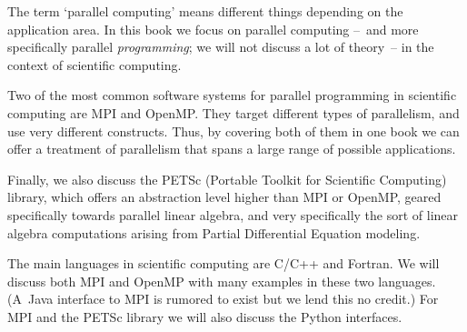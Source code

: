 
The term `parallel computing' means different things
depending on the application area. In this book we focus
on parallel computing
--~and more specifically parallel \emph{programming};
we will not discuss a lot of theory~--
in the context of scientific computing.

Two of the most common software systems for parallel programming
in scientific computing are MPI and OpenMP.
They target different types of parallelism,
and use very different constructs. 
Thus, by covering both of them in one book
we can offer a treatment of parallelism that
spans a large range of possible applications.

Finally, we also discuss the PETSc
(Portable Toolkit for Scientific Computing)
library, which offers an abstraction level higher than
MPI or OpenMP, geared specifically towards
parallel linear algebra,
and very specifically the sort of linear algebra
computations arising from Partial Differential Equation modeling.

The main languages in scientific computing are C/C++ and Fortran.
We will discuss both MPI and OpenMP with many examples in these two languages.
(A~Java interface to MPI is rumored to exist but we lend this no credit.)
For MPI and the PETSc library we will also discuss the Python interfaces.

